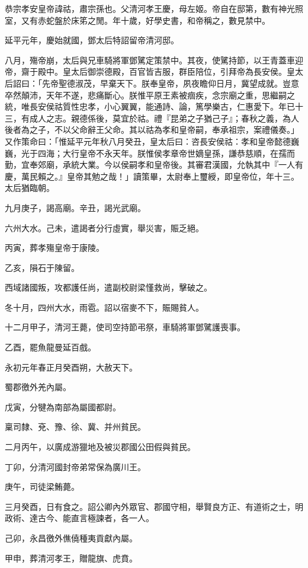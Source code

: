 
\begin{pinyinscope}
恭宗孝安皇帝諱祜，肅宗孫也。父清河孝王慶，母左姬。帝自在邸第，數有神光照室，又有赤蛇盤於床笫之閒。年十歲，好學史書，和帝稱之，數見禁中。

延平元年，慶始就國，鄧太后特詔留帝清河邸。

八月，殤帝崩，太后與兄車騎將軍鄧騭定策禁中。其夜，使騭持節，以王青蓋車迎帝，齋于殿中。皇太后御崇德殿，百官皆吉服，群臣陪位，引拜帝為長安侯。皇太后詔曰：「先帝聖德淑茂，早棄天下。朕奉皇帝，夙夜瞻仰日月，冀望成就。豈意卒然顛沛，天年不遂，悲痛斷心。朕惟平原王素被痼疾，念宗廟之重，思繼嗣之統，唯長安侯祜質性忠孝，小心翼翼，能通詩、論，篤學樂古，仁惠愛下。年已十三，有成人之志。親德係後，莫宜於祜。禮『昆弟之子猶己子』；春秋之義，為人後者為之子，不以父命辭王父命。其以祜為孝和皇帝嗣，奉承祖宗，案禮儀奏。」又作策命曰：「惟延平元年秋八月癸丑，皇太后曰：咨長安侯祜：孝和皇帝懿德巍巍，光于四海；大行皇帝不永天年。朕惟侯孝章帝世嫡皇孫，謙恭慈順，在孺而勤，宜奉郊廟，承統大業。今以侯嗣孝和皇帝後。其審君漢國，允執其中『一人有慶，萬民賴之。』皇帝其勉之哉！」讀策畢，太尉奉上璽綬，即皇帝位，年十三。太后猶臨朝。

九月庚子，謁高廟。辛丑，謁光武廟。

六州大水。己未，遣謁者分行虛實，舉災害，賑乏絕。

丙寅，葬孝殤皇帝于康陵。

乙亥，隕石于陳留。

西域諸國叛，攻都護任尚，遣副校尉梁慬救尚，擊破之。

冬十月，四州大水，雨雹。詔以宿麥不下，賑賜貧人。

十二月甲子，清河王薨，使司空持節弔祭，車騎將軍鄧騭護喪事。

乙酉，罷魚龍曼延百戲。

永初元年春正月癸酉朔，大赦天下。

蜀郡徼外羌內屬。

戊寅，分犍為南部為屬國都尉。

稟司隸、兗、豫、徐、冀、并州貧民。

二月丙午，以廣成游獵地及被災郡國公田假與貧民。

丁卯，分清河國封帝弟常保為廣川王。

庚午，司徒梁鮪薨。

三月癸酉，日有食之。詔公卿內外眾官、郡國守相，舉賢良方正、有道術之士，明政術、達古今、能直言極諫者，各一人。

己卯，永昌徼外僬僥種夷貢獻內屬。

甲申，葬清河孝王，贈龍旗、虎賁。


\end{pinyinscope}
